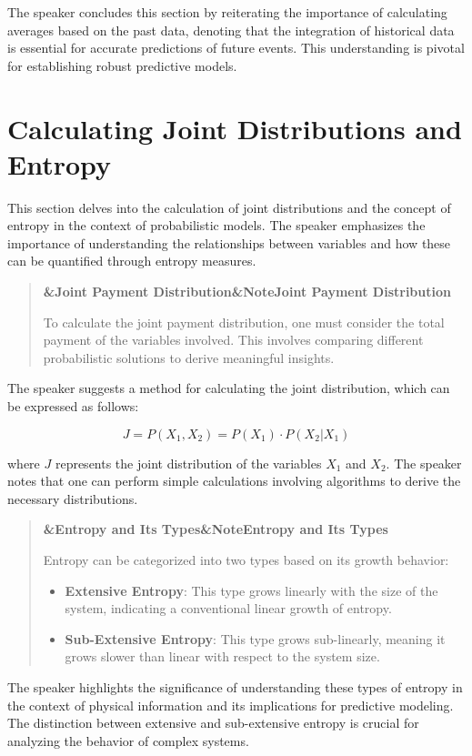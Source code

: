 \documentclass[a4paper]{article}
\newcommand{\boxheading}[1]{%
  \par\smallskip
  \noindent\textbf{\ifx&#1&Note\else#1\fi}\par
  \smallskip
}
\newenvironment{exbox}[1][]{%
  \begin{quote}\color{brown!70!black}\boxheading{#1}\normalcolor
}{\end{quote}}
\newenvironment{rembox}[1][]{%
  \begin{quote}\color{black!70}\boxheading{#1}\normalcolor
}{\end{quote}}
\begin{document}
The speaker concludes this section by reiterating the importance of calculating averages based on the past data, denoting that the integration of historical data is essential for accurate predictions of future events. This understanding is pivotal for establishing robust predictive models.

\section{Calculating Joint Distributions and Entropy}
This section delves into the calculation of joint distributions and the concept of entropy in the context of probabilistic models. The speaker emphasizes the importance of understanding the relationships between variables and how these can be quantified through entropy measures.

\begin{rembox}[Joint Payment Distribution]
To calculate the joint payment distribution, one must consider the total payment of the variables involved. This involves comparing different probabilistic solutions to derive meaningful insights.
\end{rembox}

The speaker suggests a method for calculating the joint distribution, which can be expressed as follows:

\begin{equation}
J = P(X_1, X_2) = P(X_1) \cdot P(X_2 | X_1)
\end{equation}

where \( J \) represents the joint distribution of the variables \( X_1 \) and \( X_2 \). The speaker notes that one can perform simple calculations involving algorithms to derive the necessary distributions.

\begin{exbox}[Entropy and Its Types]
Entropy can be categorized into two types based on its growth behavior:
\begin{itemize}
    \item \textbf{Extensive Entropy}: This type grows linearly with the size of the system, indicating a conventional linear growth of entropy.
    \item \textbf{Sub-Extensive Entropy}: This type grows sub-linearly, meaning it grows slower than linear with respect to the system size.
\end{itemize}
\end{exbox}

The speaker highlights the significance of understanding these types of entropy in the context of physical information and its implications for predictive modeling. The distinction between extensive and sub-extensive entropy is crucial for analyzing the behavior of complex systems.
\end{document}
